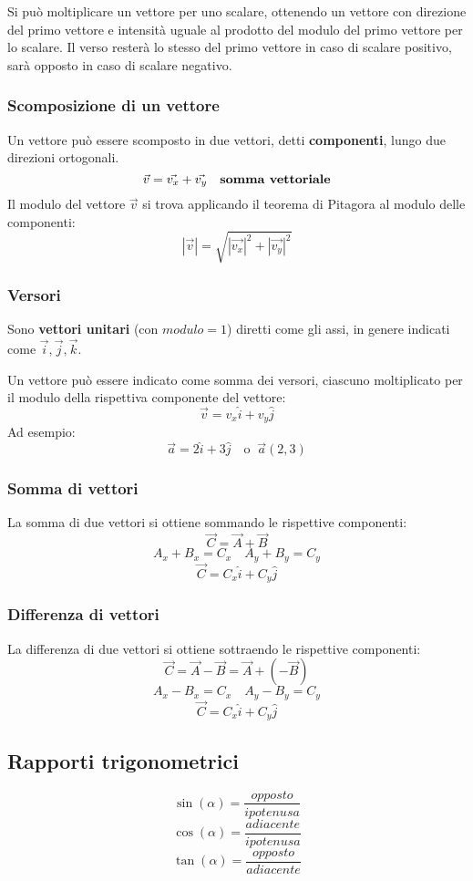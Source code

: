 \documentclass[a4paper]{article}
\theoremstyle{break}
\theoremstyle{break}
\theoremstyle{break}
\theoremstyle{break}
\begin{document}
\noindent Si può moltiplicare un vettore per uno scalare, ottenendo un vettore con direzione del primo vettore
e intensità uguale al prodotto del modulo del primo vettore per lo scalare. Il verso resterà lo stesso
del primo vettore in caso di scalare positivo, sarà opposto in caso di scalare negativo.

\subsubsection{Scomposizione di un vettore}
Un vettore può essere scomposto in due vettori, detti \textbf{componenti}, lungo due direzioni ortogonali.
\[
	\vec{v} = \vec{v_x} + \vec{v_y} \quad \text{\textbf{somma vettoriale}}
\]
\label{D4}
Il modulo del vettore \( \vec{v} \) si trova applicando il teorema di Pitagora al modulo delle componenti:
\[
	|\vec{v}| = \sqrt{|\vec{v_x}|^2 + |\vec{v_y}|^2}
\]
\subsubsection{Versori}
Sono \textbf{vettori unitari} (con \( modulo=1 \)) diretti come gli assi, in genere indicati come
\( \vec{i},\vec{j},\vec{k} \).

\noindent Un vettore può essere indicato come somma dei versori, ciascuno moltiplicato per il modulo
della rispettiva componente del vettore:
\[
	\vec{v} = v_x\hat{i} + v_y\hat{j}
\]
Ad esempio:
\[
	\vec{a} = 2\hat{i} + 3\hat{j} \quad \text{o} \;\; \vec{a}(2,3)
\]

\subsubsection{Somma di vettori}
La somma di due vettori si ottiene sommando le rispettive componenti:
\label{D5}
\[
	\vec{C} = \vec{A} + \vec{B}
\]
\[
	A_x+B_x = C_x \quad A_y+B_y = C_y
\]
\[
	\vec{C} = C_x\hat{i} + C_y\hat{j}
\]

\subsubsection{Differenza di vettori}
La differenza di due vettori si ottiene sottraendo le rispettive componenti:
\label{D6}
\[
	\vec{C} = \vec{A} - \vec{B} = \vec{A} + (-\vec{B})
\]
\[
	A_x-B_x = C_x \quad A_y-B_y = C_y
\]
\[
	\vec{C} = C_x\hat{i} + C_y\hat{j}
\]

\subsection{Rapporti trigonometrici}
\[
	\sin(\alpha) = \frac{opposto}{ipotenusa}
\]
\[
	\cos(\alpha) = \frac{adiacente}{ipotenusa}
\]
\[
	\tan(\alpha) = \frac{opposto}{adiacente}
\]
\end{document}
